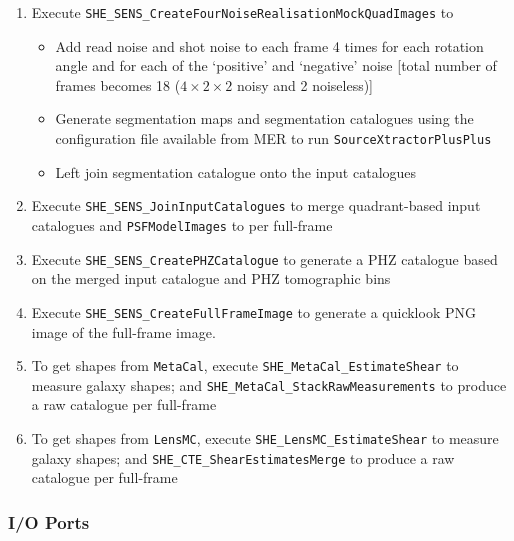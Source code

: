 \documentclass[11pt]{EuclidVIS}
\numberwithin{table}{section}
\numberwithin{figure}{section}
\begin{document}
\begin{enumerate}
    \item Execute \texttt{SHE\_SENS\_CreateFourNoiseRealisationMockQuadImages} to
        \begin{itemize}
            \item Add read noise and shot noise to each frame 4 times for each rotation angle and for each of the `positive' and `negative' noise [total number of frames becomes 18 ($4 \times 2 \times 2$ noisy and 2 noiseless)]
            \item Generate segmentation maps and segmentation catalogues using the configuration file available from MER to run \texttt{SourceXtractorPlusPlus}
            \item Left join segmentation catalogue onto the input catalogues
        \end{itemize}
    \item Execute \texttt{SHE\_SENS\_JoinInputCatalogues} to merge quadrant-based input catalogues and \texttt{PSFModelImages} to per full-frame
    \item Execute \texttt{SHE\_SENS\_CreatePHZCatalogue} to generate a PHZ catalogue based on the merged input catalogue and PHZ tomographic bins
    \item Execute \texttt{SHE\_SENS\_CreateFullFrameImage} to generate a quicklook PNG image of the full-frame image.
    \item To get shapes from \texttt{MetaCal}, execute \texttt{SHE\_MetaCal\_EstimateShear} to measure galaxy shapes; and \texttt{SHE\_MetaCal\_StackRawMeasurements} to produce a raw catalogue per full-frame
    \item To get shapes from \texttt{LensMC}, execute \texttt{SHE\_LensMC\_EstimateShear} to measure galaxy shapes; and \texttt{SHE\_CTE\_ShearEstimatesMerge} to produce a raw catalogue per full-frame
\end{enumerate}


\subsubsection{I/O Ports}
\end{document}
